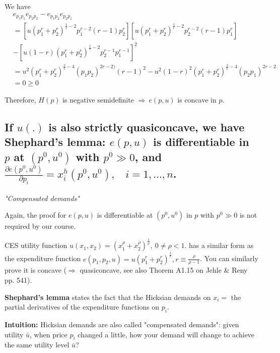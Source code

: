 \documentclass{article}
\begin{document}
\begin{mdframed}[backgroundcolor=blue!20,linecolor=white]
We have
\begin{align*}
&e_{p_1p_1}e_{p_2p_2} - e_{p_1p_2}e_{p_2p_1} \\
&=[u(p_1^{r} + p_2^{r})^{\frac{1}{r} - 2} p_1^{r-2} (r-1)p_2^r][u(p_1^{r} + p_2^{r})^{\frac{1}{r} - 2} p_2^{r-2} (r-1)p_1^r] \\
& - [u (1-r)(p_1^{r} + p_2^{r})^{\frac{1}{r} - 2} p_2^{r-1}p_1^{r-1}]^2 \\ &=u^2(p_1^{r} + p_2^{r})^{\frac{2}{r} - 4}(p_1p_2)^{2r-2)} (r-1)^2 -
u^2(1-r)^2(p_1^{r} + p_2^{r})^{\frac{2}{r} - 4} (p_2p_1)^{2r-2} \\
&= 0 \ge 0
\end{align*}

Therefore, $H(p)$ is negative semidefinite $\Rightarrow \ e(p,u)$ is concave in $p$.

\end{mdframed}

\subsection{If $u(.)$ is also strictly quasiconcave, we have Shephard’s lemma: $e(p, u)$ is differentiable in $p$ at $(p^0, u^0)$ with $p^0 \gg 0$, and $\frac{\partial e(p^0, u^0)}{\partial p_i} = x^h_i (p^0, u^0), \ \ \ \ i = 1, . . . , n$.}

\begin{mdframed}[backgroundcolor=blue!20,linecolor=white]
\textit{"Compensated demands"}

Again, the proof for $e(p,u)$ is differentiable at $(p^0,u^0)$ in $p$ with $p^0 \gg 0$ is not required by our course.

CES utility function $u(x_1, x_2) = (x_1^{\rho} + x_2^{\rho})^{\frac{1}{\rho}}, \ 0 \ne \rho<1.$ has a similar form as the expenditure function 
$e(p_1,p_2, u) = u(p_1^{r} + p_2^{r})^{\frac{1}{r}} , r \equiv \frac{\rho}{\rho - 1}$. You can similarly prove it is concave ($\Rightarrow$ quasiconcave, see also Thorem A1.15 on Jehle \& Reny pp. 541).

\vspace{3mm}

\textbf{Shephard’s lemma} states the fact that the Hicksian demands on $x_i=$ the partial derivatives of the expenditure functions on $p_i$.

\textbf{Intuition:} Hicksian demands are also called "compensated demands": given utility $\bar{u}$, when price $p_i$ changed a little, how your demand will change to achieve the same utility level $\bar{u}$?

\end{mdframed}
\end{document}
